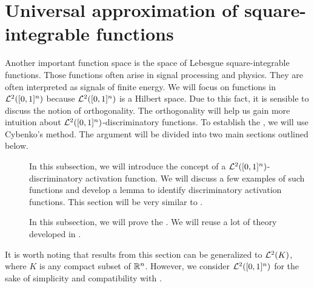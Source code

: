 \section{Universal approximation of square-integrable functions}
\label{section:universality:ltwo}
Another important function space is the space of Lebesgue square-integrable functions. Those functions often arise in signal processing and physics. They are often interpreted as signals of finite energy. We will focus on functions in ${\mathcal {L}^2}([0,1]^n)$ because ${\mathcal {L}^2}([0,1]^n)$ is a Hilbert space. Due to this fact, it is sensible to discuss the notion of orthogonality. The orthogonality will help us gain more intuition about ${\mathcal {L}^2}([0,1]^n)$-discriminatory functions.
To establish the , we will use Cybenko's method. The argument will be divided into two main sections outlined below.
\begin{description}
\item[] In this subsection, we will introduce the concept of a ${\mathcal {L}^2}([0,1]^n)$-discriminatory activation function. We will discuss a few examples of such functions and develop a lemma to identify discriminatory activation functions. This section will be very similar to .
\item[] In this subsection, we will prove the . We will reuse a lot of theory developed in .
\end{description}
\begin{remark}
It is worth noting that results from this section can be generalized to ${\mathcal {L}^2}(K)$, where $K$ is any compact subset of ${\mathbb R}^n$. However, we consider ${\mathcal {L}^2}([0,1]^n)$ for the sake of simplicity and compatibility with \cite{cybenko_1989_approximation}.
\end{remark}

